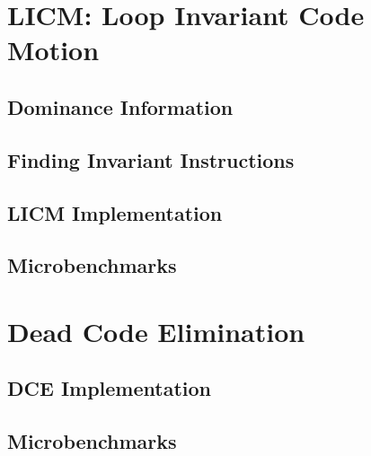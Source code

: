 \section{LICM: Loop Invariant Code Motion}

\subsection{Dominance Information}

\subsection{Finding Invariant Instructions}

\subsection{LICM Implementation}

\subsection{Microbenchmarks}

\section{Dead Code Elimination}

\subsection{DCE Implementation}

\subsection{Microbenchmarks}

